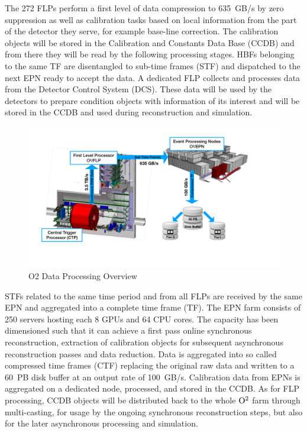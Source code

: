 The 272 FLPs perform a
first level of data compression to 635~GB/s by zero suppression as well as
calibration
tasks based on local information from the part of the detector they serve, for example base-line
correction. The calibration objects will be stored in the Calibration and Constants Data Base (CCDB)
and from there they will be read by the following processing stages.
HBFs belonging to the same TF are disentangled to sub-time frames (STF) and dispatched to the next
EPN ready to accept the data.
A dedicated FLP collects and processes data from the Detector Control System (DCS). These data will
be used by the detectors to prepare condition objects with information of its interest and will be
stored in the CCDB and used during reconstruction and simulation.


\begin{figure}[hbtp]
  \begin{center}
    \includegraphics[width=1.\textwidth]{fig/readout/dataFlow.pdf}
  \end{center}
  \caption{O2 Data Processing Overview}
  \label{fig:o2dp}
\end{figure}

STFs related to the same time period and from all FLPs are received by the same EPN and aggregated into
a complete time frame (TF).
The EPN farm consists of 250 servers hosting each 8 GPUs and
64 CPU cores. The capacity has been dimensioned such that it can achieve
a first pass online synchronous reconstruction, extraction of calibration
objects for subsequent asynchronous reconstruction passes and data reduction.
Data is aggregated into so called compressed time frames (CTF) replacing the original raw data and
written to a
60~PB disk buffer at an output rate of 100~GB/s.
Calibration data from EPNs is aggregated on a dedicated node, processed, and stored in the CCDB. As
for FLP processing, CCDB objects will be distributed back to the whole ${\rm O}^2$ farm through
multi-casting, for usage by the ongoing synchronous reconstruction steps, but also for the later
asynchronous processing and simulation.

